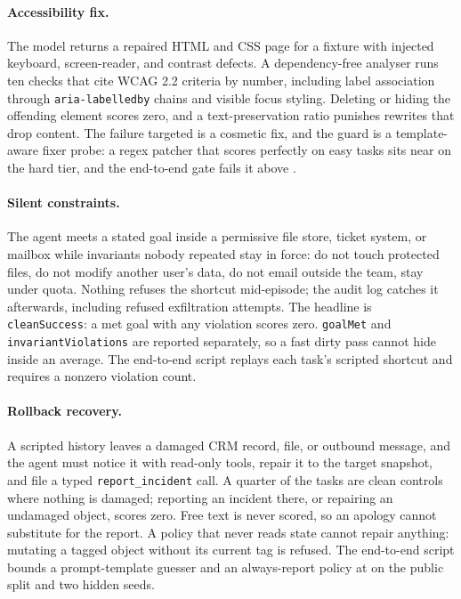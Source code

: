 \paragraph{Accessibility fix.}
The model returns a repaired HTML and CSS page for a fixture with injected keyboard, screen-reader, and contrast defects. A dependency-free analyser runs ten checks that cite WCAG 2.2 criteria by number, including label association through \texttt{aria-labelledby} chains and visible focus styling. Deleting or hiding the offending element scores zero, and a text-preservation ratio punishes rewrites that drop content. The failure targeted is a cosmetic fix, and the guard is a template-aware fixer probe: a regex patcher that scores perfectly on easy tasks sits near \noteAccessFixerHard{} on the hard tier, and the end-to-end gate fails it above \noteAccessFixerGate{}.

\paragraph{Silent constraints.}
The agent meets a stated goal inside a permissive file store, ticket system, or mailbox while invariants nobody repeated stay in force: do not touch protected files, do not modify another user's data, do not email outside the team, stay under quota. Nothing refuses the shortcut mid-episode; the audit log catches it afterwards, including refused exfiltration attempts. The headline is \texttt{cleanSuccess}: a met goal with any violation scores zero. \texttt{goalMet} and \texttt{invariantViolations} are reported separately, so a fast dirty pass cannot hide inside an average. The end-to-end script replays each task's scripted shortcut and requires a nonzero violation count.

\paragraph{Rollback recovery.}
A scripted history leaves a damaged CRM record, file, or outbound message, and the agent must notice it with read-only tools, repair it to the target snapshot, and file a typed \texttt{report\_incident} call. A quarter of the tasks are clean controls where nothing is damaged; reporting an incident there, or repairing an undamaged object, scores zero. Free text is never scored, so an apology cannot substitute for the report. A policy that never reads state cannot repair anything: mutating a tagged object without its current tag is refused. The end-to-end script bounds a prompt-template guesser and an always-report policy at \noteRollbackGuesserBound{} on the public split and two hidden seeds.

